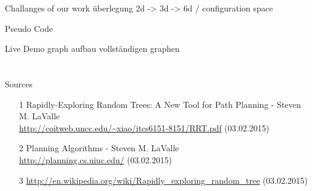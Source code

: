 \documentclass[%
  professionalfonts,%
  xcolor={%
    usenames,%
    dvipsnames,%
    svgnames,%
    table,%
    hyperref%
  }%
]{beamer}
\begin{document}
      \begin{frame}{Challanges of our work}
        überlegung 2d -> 3d -> 6d / configuration space
      \end{frame}
      
      \begin{frame}{Pseudo Code}
        
      \end{frame}
      
      \begin{frame}{Live Demo}
        graph aufbau 
        vollständigen graphen
      \end{frame}
        
  \section{}
    \begin{frame}{Sources}
      \begin{itemize}
        \item[1] Rapidly-Exploring Random Trees: A New Tool for Path Planning - Steven M. LaValle 
        \\\url{http://coitweb.uncc.edu/~xiao/itcs6151-8151/RRT.pdf} (03.02.2015)
        \item[2] Planning Algorithms - Steven M. LaValle \\\url{http://planning.cs.uiuc.edu/} (03.02.2015)
        \item[3] \url{http://en.wikipedia.org/wiki/Rapidly_exploring_random_tree} (03.02.2015)
    \end{itemize}
  \end{frame}
  
  \begin{frame}
    \Huge{}
  \end{frame}
\end{document}
